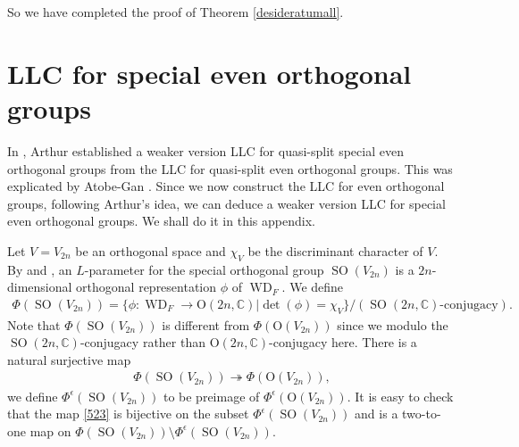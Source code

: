 \documentclass[article]{article}
\numberwithin{equation}{section}
\theoremstyle{definition}
\DeclareMathOperator{\WD}{WD}
\DeclareMathOperator{\SO}{SO}
\begin{document}
So we have completed the proof of Theorem \ref{desideratumall}. 


\appendix
\section{LLC for special even orthogonal groups}
In \cite{MR3135650}, Arthur established a weaker version LLC for quasi-split special even orthogonal groups from the LLC for quasi-split even orthogonal groups. This was explicated by Atobe-Gan \cite{MR3708200}. Since we now construct the LLC for even orthogonal groups, following Arthur's idea, we can deduce a weaker version LLC for special even orthogonal groups. We shall do it in this appendix. 

Let $V=V_{2n}$ be an orthogonal space and $\chi_V$ be the discriminant character of $V$. By \cite[\S 8]{MR3202556} and \cite[\S 3]{MR3708200}, an $L$-parameter for the special orthogonal group $\SO(V_{2n})$ is a $2n$-dimensional orthogonal representation $\phi$ of $\WD_{F}$. We define
\begin{align*}
\Phi(\SO(V_{2n}))=\{\phi: \WD_{F} \rightarrow \mathrm{O}(2n, \mathbb{C}) | \det(\phi)=\chi_{V}\} /(\SO(2n, \mathbb{C})\mbox{-conjugacy}).
\end{align*} 
Note that $\Phi(\SO(V_{2n}))$ is different from $\Phi(\mathrm O(V_{2n}))$ since we modulo the $\SO(2n,\mathbb C)$-conjugacy rather than $\mathrm O(2n,\mathbb C)$-conjugacy here. There is a natural surjective map 
\begin{align}\label{523}
\Phi(\SO(V_{2n}))\twoheadrightarrow \Phi(\mathrm O(V_{2n})),  
\end{align} 
we define $\Phi^\epsilon(\SO(V_{2n}))$ to be preimage of $\Phi^\epsilon(\mathrm O(V_{2n}))$. It is easy to check that the map \ref{523} is bijective on the subset $\Phi^\epsilon(\SO(V_{2n}))$ and is a two-to-one map on $\Phi(\SO(V_{2n}))\setminus \Phi^\epsilon(\SO(V_{2n}))$. 
\end{document}
